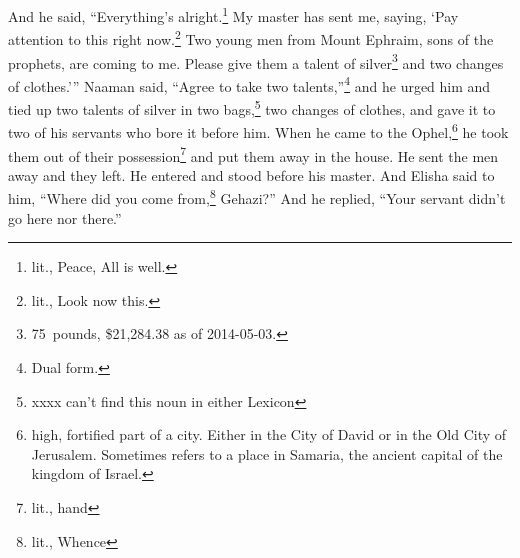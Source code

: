 \begin{inparaenum}
     And he said, ``Everything's alright.\footnote{lit., Peace, All is well.} My master has sent me, saying, `Pay attention to this right now.\footnote{lit., Look now this.} Two young men from Mount Ephraim, sons of the prophets, are coming to me. Please give them a talent of silver\footnote{75~pounds, \$21,284.38 as of 2014-05-03.} and two changes of clothes.'\thinspace''%
     Naaman said, ``Agree to take two talents,''\footnote{Dual form.} and he urged him and tied up two talents of silver in two bags,\footnote{xxxx can't find this noun in either Lexicon} two changes of clothes, and gave it to two of his servants who bore it before him.%
     When he came to the Ophel,\footnote{high, fortified part of a city. Either in the City of David or in the Old City of Jerusalem. Sometimes refers to a place in Samaria, the ancient capital of the kingdom of Israel.} he took them out of their possession\footnote{lit., hand} and put them away in the house. He sent the men away and they left.%
     He entered and stood before his master. And Elisha said to him, ``Where did you come from,\footnote{lit., Whence} Gehazi?'' And he replied, ``Your servant didn't go here nor there.''%
\end{inparaenum}
